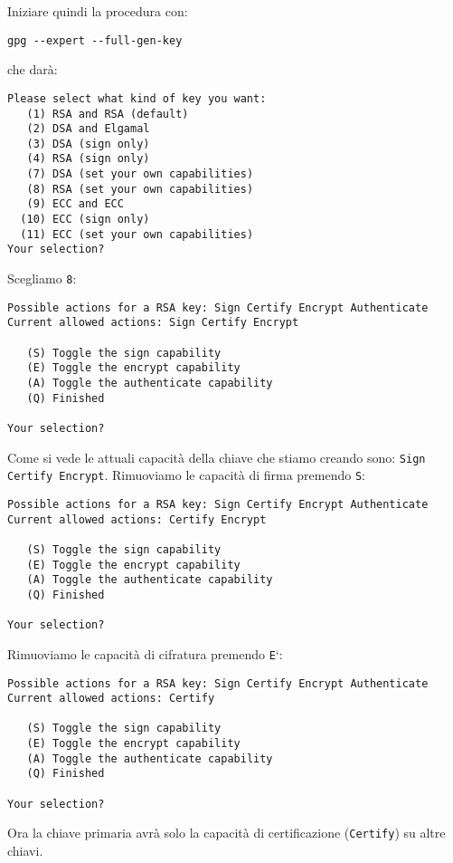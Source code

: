 \documentclass[a4paper,10pt]{article}
\begin{document}
Iniziare quindi la procedura con:

\begin{verbatim}
gpg --expert --full-gen-key
\end{verbatim}

che darà:

\begin{verbatim}
Please select what kind of key you want:
   (1) RSA and RSA (default)
   (2) DSA and Elgamal
   (3) DSA (sign only)
   (4) RSA (sign only)
   (7) DSA (set your own capabilities)
   (8) RSA (set your own capabilities)
   (9) ECC and ECC
  (10) ECC (sign only)
  (11) ECC (set your own capabilities)
Your selection?
\end{verbatim}

Scegliamo \texttt{8}:

\begin{verbatim}
Possible actions for a RSA key: Sign Certify Encrypt Authenticate
Current allowed actions: Sign Certify Encrypt

   (S) Toggle the sign capability
   (E) Toggle the encrypt capability
   (A) Toggle the authenticate capability
   (Q) Finished

Your selection?
\end{verbatim}

Come si vede le attuali capacità della chiave che stiamo creando sono: \texttt{Sign Certify Encrypt}.
Rimuoviamo le capacità di firma premendo \texttt{S}:

\begin{verbatim}
Possible actions for a RSA key: Sign Certify Encrypt Authenticate
Current allowed actions: Certify Encrypt

   (S) Toggle the sign capability
   (E) Toggle the encrypt capability
   (A) Toggle the authenticate capability
   (Q) Finished

Your selection?
\end{verbatim}

Rimuoviamo le capacità di cifratura premendo \texttt{E}`:

\begin{verbatim}
Possible actions for a RSA key: Sign Certify Encrypt Authenticate
Current allowed actions: Certify

   (S) Toggle the sign capability
   (E) Toggle the encrypt capability
   (A) Toggle the authenticate capability
   (Q) Finished

Your selection?
\end{verbatim}

Ora la chiave primaria avrà solo la capacità di certificazione (\texttt{Certify}) su altre chiavi.
\end{document}
